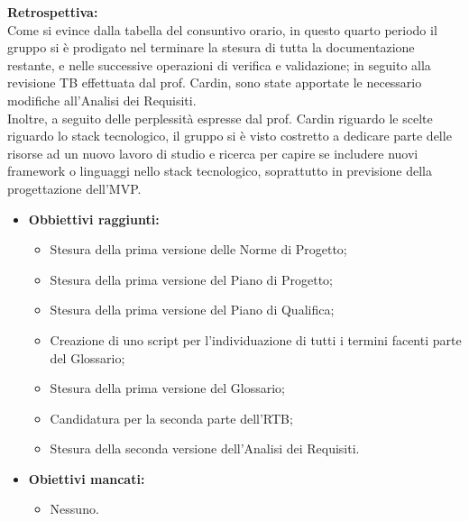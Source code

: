 \textbf{Retrospettiva:} \\
Come si evince dalla tabella del consuntivo orario, in questo quarto periodo il gruppo si è prodigato nel terminare la stesura di tutta la documentazione restante,
e nelle successive operazioni di verifica e validazione; in seguito alla revisione TB effettuata dal prof. Cardin, sono state apportate le necessario modifiche all'Analisi
dei Requisiti.\\
Inoltre, a seguito delle perplessità espresse dal prof. Cardin riguardo le scelte riguardo lo stack tecnologico, il gruppo si è visto costretto a dedicare parte delle risorse ad
un nuovo lavoro di studio e ricerca per capire se includere nuovi framework o linguaggi nello stack tecnologico, soprattutto in previsione della progettazione dell'MVP.
\begin{itemize}
    \item \textbf{Obbiettivi raggiunti:}
    \begin{itemize}
        \item Stesura della prima versione delle Norme di Progetto;
        \item Stesura della prima versione del Piano di Progetto;
        \item Stesura della prima versione del Piano di Qualifica;
        \item Creazione di uno script per l'individuazione di tutti i termini facenti parte del Glossario;
        \item Stesura della prima versione del Glossario;
        \item Candidatura per la seconda parte dell'RTB;
        \item Stesura della seconda versione dell'Analisi dei Requisiti.
    \end{itemize}
    \item \textbf{Obiettivi mancati:}
    \begin{itemize}
        \item Nessuno.
    \end{itemize}
\end{itemize}
